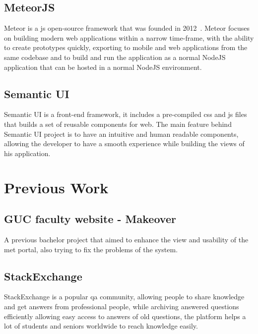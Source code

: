 \subsection{MeteorJS}
\label{sub:meteor}
Meteor is a \ac{js} open-source framework that was founded in 2012~\cite{meteor_launch}.
Meteor focuses on building modern web applications within a narrow time-frame, with the ability to create prototypes quickly, exporting to mobile
and web applications from the same codebase and to build and run the application as a normal NodeJS application that can be hosted in a normal
NodeJS environment.

\subsection{Semantic UI}
\label{sub:semantic_ui}
Semantic UI is a front-end framework, it includes a pre-compiled \ac{css} and \ac{js} files that builds a set of reusable components
for web. The main feature behind Semantic UI project is to have an intuitive and human readable components, allowing
the developer to have a smooth experience while building the views of his application.~\cite{semantic_ui}

\section{Previous Work}
\label{sec:previous-work}

\subsection{GUC faculty website - Makeover}
\label{sub:met-makeover-project}
A previous bachelor project that aimed to enhance the view and usability of the \ac{met} portal, also trying to fix the
problems of the system.~\cite{met-makeover}

\subsection{StackExchange}
\label{sub:stackexchange}
StackExchange is a popular \ac{qa} community, allowing people to share knowledge and get answers from professional
people, while archiving answered questions efficiently allowing easy access to answers of old questions, the
platform helps a lot of students and seniors worldwide to reach knowledge easily.
